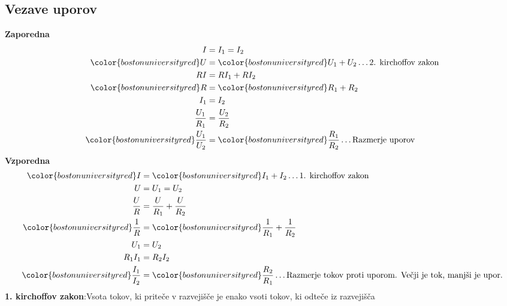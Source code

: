 {\color{indiagreen}\subsection{Vezave uporov}}
\textbf{Zaporedna}\\
\begin{align*}
	I &= I_1 = I_2\\
	{\color{bostonuniversityred}U} &= {\color{bostonuniversityred}U_1 + U_2} \dots \text{2. kirchoffov zakon}\\
	RI &= RI_1 + RI_2\\
	{\color{bostonuniversityred}R} &= {\color{bostonuniversityred}R_1 + R_2}\\
	I_1 &= I_2\\
	\frac{U_1}{R_1} &= \frac{U_2}{R_2}\\
	{\color{bostonuniversityred}\frac{U_1}{U_2}} &= {\color{bostonuniversityred}\frac{R_1}{R_2}} \dots \text{Razmerje uporov}\\
\end{align*}
\textbf{Vzporedna}\\
\begin{align*}
	{\color{bostonuniversityred}I} &= {\color{bostonuniversityred}I_1 + I_2} \dots \text{1. kirchoffov zakon}\\
	U &= U_1 = U_2\\
	\frac{U}{R} &= \frac{U}{R_1} + \frac{U}{R_2}\\
	{\color{bostonuniversityred}\frac{1}{R}} &= {\color{bostonuniversityred}\frac{1}{R_1} + \frac{1}{R_2}}\\
	U_1 &= U_2\\
	R_1 I_1 &= R_2 I_2\\
	{\color{bostonuniversityred}\frac{I_1}{I_2}} &= {\color{bostonuniversityred}\frac{R_2}{R_1}} \dots \text{Razmerje tokov proti uporom. Večji je tok, manjši je upor.}\\
\end{align*}
\textbf{1. kirchoffov zakon}:Vsota tokov, ki priteče v razvejišče je enako vsoti tokov, ki odteče iz razvejišča\\